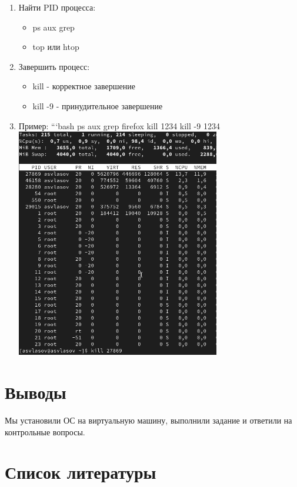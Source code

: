 \documentclass[
  12pt,
  a4paper,
  DIV=11,
  numbers=noendperiod]{scrreprt}
\providecommand{\tightlist}{%
  \setlength{\itemsep}{0pt}\setlength{\parskip}{0pt}}\usepackage{longtable,booktabs,array}
\begin{document}
\begin{enumerate}
\def\labelenumi{\arabic{enumi}.}
\tightlist
\item
  Найти PID процесса:

  \begin{itemize}
  \tightlist
  \item
    ps aux \textbar{} grep
  \item
    top или htop
  \end{itemize}
\item
  Завершить процесс:

  \begin{itemize}
  \tightlist
  \item
    kill - корректное завершение
  \item
    kill -9 - принудительное завершение
  \end{itemize}
\item
  Пример: ```bash ps aux \textbar{} grep firefox kill 1234 kill -9 1234
  \includegraphics[width=0.7\textwidth,height=\textheight]{image/28.png}
\end{enumerate}

\chapter{Выводы}\label{ux432ux44bux432ux43eux434ux44b}

Мы установили ОС на виртуальную машину, выполнили задание и ответили на
контрольные вопросы.

\chapter*{Список
литературы}\label{ux441ux43fux438ux441ux43eux43a-ux43bux438ux442ux435ux440ux430ux442ux443ux440ux44b}

\printbibliography[heading=none]
\end{document}

